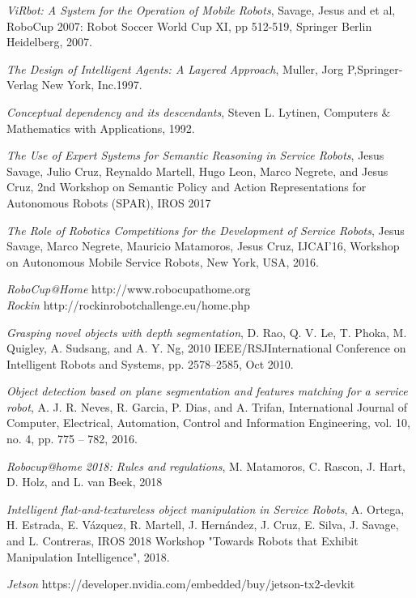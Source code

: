 \documentclass{llncs}
\begin{document}
\begin{thebibliography}{1}


{\em ViRbot: A System for the Operation of Mobile Robots}, Savage, Jesus and et al, RoboCup 2007: Robot Soccer World Cup XI,
pp 512-519, Springer Berlin Heidelberg, 2007.

{\em The Design of Intelligent Agents: A Layered Approach}, Muller, Jorg P,Springer-Verlag New York, Inc.1997.

{\em Conceptual dependency and its descendants}, Steven L. Lytinen, Computers \& Mathematics with Applications, 1992.

\textit{The Use of Expert Systems for Semantic Reasoning in Service Robots}, Jesus Savage, Julio Cruz, Reynaldo Martell, Hugo Leon, Marco Negrete, and Jesus Cruz, 2nd Workshop on Semantic Policy and Action Representations for Autonomous Robots (SPAR), IROS 2017

{\em The Role of Robotics Competitions for the Development of Service Robots}, 
 Jesus Savage, Marco Negrete, Mauricio Matamoros, Jesus Cruz,
IJCAI'16, Workshop on Autonomous Mobile Service Robots, New York, USA, 2016.

{\em RoboCup@Home} http://www.robocupathome.org
\\
{\em Rockin} http://rockinrobotchallenge.eu/home.php

\textit{Grasping novel objects with depth segmentation}, D. Rao, Q. V. Le, T. Phoka, M. Quigley, A. Sudsang, and A. Y. Ng, 2010 IEEE/RSJInternational Conference on Intelligent Robots and Systems, pp. 2578–2585, Oct 2010.

\textit{Object detection
based on plane segmentation and features matching for a service
robot}, A. J. R. Neves, R. Garcia, P. Dias, and A. Trifan, International Journal of Computer, Electrical, Automation, Control and Information Engineering, vol. 10, no. 4, pp. 775 – 782, 2016.

\textit{Robocup@home 2018: Rules and regulations}, M. Matamoros, C. Rascon, J. Hart, D. Holz, and L. van Beek, 2018

\textit{Intelligent flat-and-textureless object manipulation in Service Robots}, A. Ortega, H. Estrada, E. Vázquez, R. Martell, J. Hernández, J. Cruz, E. Silva, J. Savage, and L. Contreras, IROS 2018 Workshop "Towards Robots that Exhibit Manipulation Intelligence", 2018.

{\em Jetson} https://developer.nvidia.com/embedded/buy/jetson-tx2-devkit

\end{thebibliography}
\end{document}
